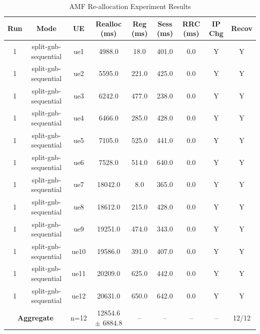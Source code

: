 \begin{table}[ht]
\centering
\begin{tabular}{|c|c|c|c|c|c|c|c|c|}
\hline
Run & Mode & UE & Realloc (ms) & Reg (ms) & Sess (ms) & RRC (ms) & IP Chg & Recov \\
\hline
1 & split-gnb-sequential & ue1 & 4988.0 & 18.0 & 401.0 & 0.0 & Y & Y \\
1 & split-gnb-sequential & ue2 & 5595.0 & 221.0 & 425.0 & 0.0 & Y & Y \\
1 & split-gnb-sequential & ue3 & 6242.0 & 477.0 & 238.0 & 0.0 & Y & Y \\
1 & split-gnb-sequential & ue4 & 6466.0 & 285.0 & 428.0 & 0.0 & Y & Y \\
1 & split-gnb-sequential & ue5 & 7105.0 & 525.0 & 441.0 & 0.0 & Y & Y \\
1 & split-gnb-sequential & ue6 & 7528.0 & 514.0 & 640.0 & 0.0 & Y & Y \\
1 & split-gnb-sequential & ue7 & 18042.0 & 8.0 & 365.0 & 0.0 & Y & Y \\
1 & split-gnb-sequential & ue8 & 18612.0 & 215.0 & 428.0 & 0.0 & Y & Y \\
1 & split-gnb-sequential & ue9 & 19251.0 & 474.0 & 343.0 & 0.0 & Y & Y \\
1 & split-gnb-sequential & ue10 & 19586.0 & 391.0 & 407.0 & 0.0 & Y & Y \\
1 & split-gnb-sequential & ue11 & 20209.0 & 625.0 & 442.0 & 0.0 & Y & Y \\
1 & split-gnb-sequential & ue12 & 20631.0 & 650.0 & 642.0 & 0.0 & Y & Y \\
\multicolumn{2}{|c|}{\textbf{Aggregate}} & n=12 & 12854.6 $\pm$ 6884.8 & -- & -- & -- & -- & 12/12 \\
\hline
\end{tabular}
\caption{AMF Re-allocation Experiment Results}
\label{tab:amf_realloc}
\end{table}
